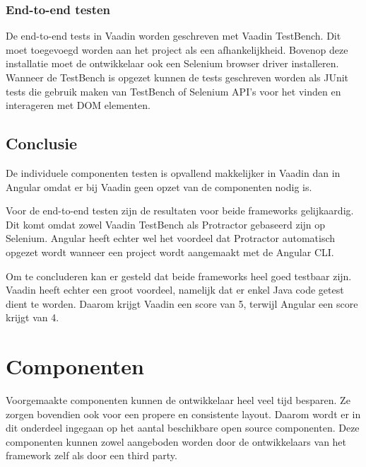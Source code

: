 \subsubsection{End-to-end testen}
De end-to-end tests in Vaadin worden geschreven met Vaadin TestBench. Dit moet toegevoegd worden aan het project als een afhankelijkheid. Bovenop deze installatie moet de ontwikkelaar ook een Selenium browser driver installeren. 
Wanneer de TestBench is opgezet kunnen de tests geschreven worden als JUnit tests die gebruik maken van TestBench of Selenium API's voor het vinden en interageren met DOM elementen. 

\subsection{Conclusie}
De individuele componenten testen is opvallend makkelijker in Vaadin dan in Angular omdat er bij Vaadin geen opzet van de componenten nodig is. 

Voor de end-to-end testen zijn de resultaten voor beide frameworks gelijkaardig. Dit komt omdat zowel Vaadin TestBench als Protractor gebaseerd zijn op Selenium. 
Angular heeft echter wel het voordeel dat Protractor automatisch opgezet wordt wanneer een project wordt aangemaakt met de Angular CLI.

Om te concluderen kan er gesteld dat beide frameworks heel goed testbaar zijn. Vaadin heeft echter een groot voordeel, namelijk dat er enkel Java code getest dient te worden. Daarom krijgt Vaadin een score van 5, terwijl Angular een score krijgt van 4. 

\section{ Componenten}
Voorgemaakte componenten kunnen de ontwikkelaar heel veel tijd besparen. Ze zorgen bovendien ook voor een propere en consistente layout. Daarom wordt er in dit onderdeel ingegaan op het aantal beschikbare open source componenten. Deze componenten kunnen zowel aangeboden worden door de ontwikkelaars van het framework zelf als door een third party.


